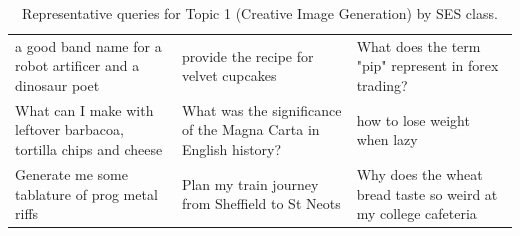 \begin{table}[ht]
\begin{tabular}{p{4.3cm}p{4.3cm}p{4.3cm}}
a good band name for a robot artificer and a dinosaur poet & provide the recipe for velvet cupcakes & What does the term "pip" represent in forex trading? \\[4pt]
What can I make with leftover barbacoa, tortilla chips and cheese & What was the significance of the Magna Carta in English history? & how to lose weight when lazy \\[4pt]
Generate me some tablature of prog metal riffs & Plan my train journey from Sheffield to St Neots & Why does the wheat bread taste so weird at my college cafeteria \\[4pt]
\bottomrule
\end{tabular}
\caption{Representative queries for Topic 1 (Creative Image Generation) by SES class.}
\label{tab:repr_queries_topic1}
\end{table}

